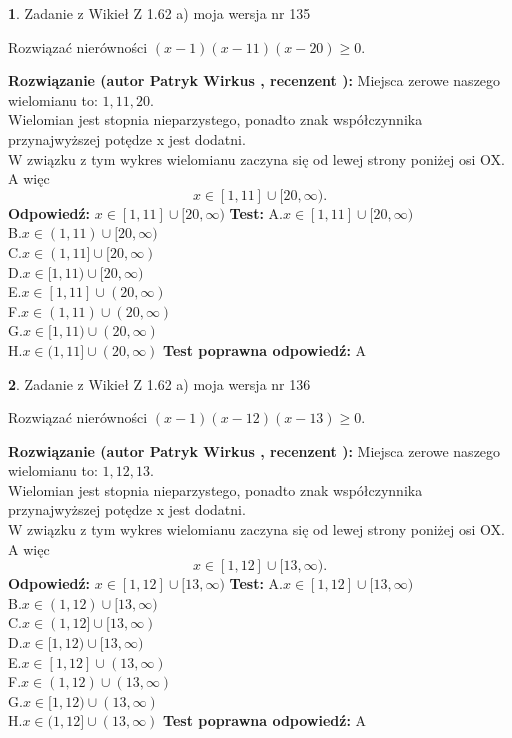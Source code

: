 \documentclass[12pt, a4paper]{article}
\theoremstyle{definition} %
\newtheorem{zad}{}
\newcommand{\zadStart}[1]{\begin{zad}#1\newline}
\newcommand{\zadStop}{\end{zad}}
\newcommand{\rozwStart}[2]{\noindent \textbf{Rozwiązanie (autor #1 , recenzent #2): }\newline}
\newcommand{\rozwStop}{\newline}
\newcommand{\odpStart}{\noindent \textbf{Odpowiedź:}\newline}
\newcommand{\odpStop}{\newline}
\newcommand{\testStart}{\noindent \textbf{Test:}\newline}
\newcommand{\testStop}{\newline}
\newcommand{\kluczStart}{\noindent \textbf{Test poprawna odpowiedź:}\newline}
\newcommand{\kluczStop}{\newline}
\begin{document}
\zadStart{Zadanie z Wikieł Z 1.62 a) moja wersja nr 135}

Rozwiązać nierówności $(x-1)(x-11)(x-20)\ge0$.
\zadStop
\rozwStart{Patryk Wirkus}{}
Miejsca zerowe naszego wielomianu to: $1, 11, 20$.\\
Wielomian jest stopnia nieparzystego, ponadto znak współczynnika przy\linebreak najwyższej potędze x jest dodatni.\\ W związku z tym wykres wielomianu zaczyna się od lewej strony poniżej osi OX. A więc $$x \in [1,11] \cup [20,\infty).$$
\rozwStop
\odpStart
$x \in [1,11] \cup [20,\infty)$
\odpStop
\testStart
A.$x \in [1,11] \cup [20,\infty)$\\
B.$x \in (1,11) \cup [20,\infty)$\\
C.$x \in (1,11] \cup [20,\infty)$\\
D.$x \in [1,11) \cup [20,\infty)$\\
E.$x \in [1,11] \cup (20,\infty)$\\
F.$x \in (1,11) \cup (20,\infty)$\\
G.$x \in [1,11) \cup (20,\infty)$\\
H.$x \in (1,11] \cup (20,\infty)$
\testStop
\kluczStart
A
\kluczStop



\zadStart{Zadanie z Wikieł Z 1.62 a) moja wersja nr 136}

Rozwiązać nierówności $(x-1)(x-12)(x-13)\ge0$.
\zadStop
\rozwStart{Patryk Wirkus}{}
Miejsca zerowe naszego wielomianu to: $1, 12, 13$.\\
Wielomian jest stopnia nieparzystego, ponadto znak współczynnika przy\linebreak najwyższej potędze x jest dodatni.\\ W związku z tym wykres wielomianu zaczyna się od lewej strony poniżej osi OX. A więc $$x \in [1,12] \cup [13,\infty).$$
\rozwStop
\odpStart
$x \in [1,12] \cup [13,\infty)$
\odpStop
\testStart
A.$x \in [1,12] \cup [13,\infty)$\\
B.$x \in (1,12) \cup [13,\infty)$\\
C.$x \in (1,12] \cup [13,\infty)$\\
D.$x \in [1,12) \cup [13,\infty)$\\
E.$x \in [1,12] \cup (13,\infty)$\\
F.$x \in (1,12) \cup (13,\infty)$\\
G.$x \in [1,12) \cup (13,\infty)$\\
H.$x \in (1,12] \cup (13,\infty)$
\testStop
\kluczStart
A
\kluczStop
\end{document}
